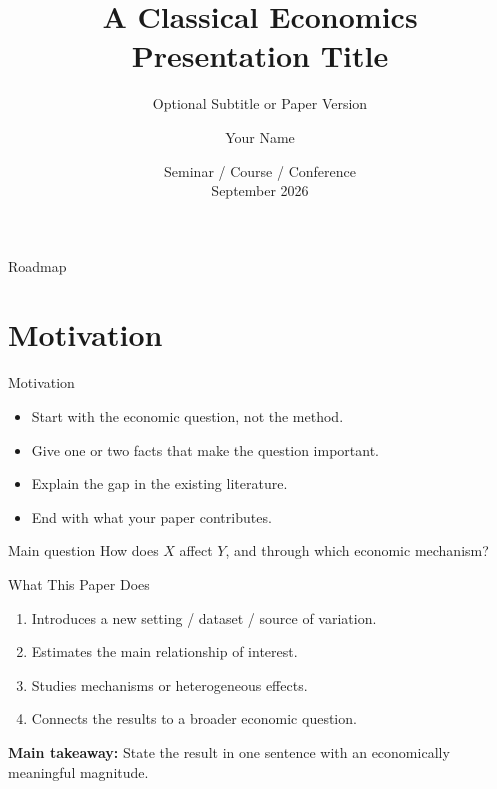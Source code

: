 \documentclass[10pt]{beamer}
\title[Short Paper Title]{A Classical Economics Presentation Title}
\subtitle{Optional Subtitle or Paper Version}
\author[Your Name]{Your Name}
\institute[University]{Department of Economics \\ Your University}
\date{Seminar / Course / Conference \\ September 2026}
\begin{document}

\begin{frame}
  \titlepage
\end{frame}

\begin{frame}{Roadmap}
  \tableofcontents
\end{frame}

\section{Motivation}

\begin{frame}{Motivation}
\begin{itemize}
  \item Start with the economic question, not the method.
  \item Give one or two facts that make the question important.
  \item Explain the gap in the existing literature.
  \item End with what your paper contributes.
\end{itemize}

\vspace{0.6em}
\begin{block}{Main question}
How does $X$ affect $Y$, and through which economic mechanism?
\end{block}
\end{frame}

\begin{frame}{What This Paper Does}
\begin{enumerate}
  \item Introduces a new setting / dataset / source of variation.
  \item Estimates the main relationship of interest.
  \item Studies mechanisms or heterogeneous effects.
  \item Connects the results to a broader economic question.
\end{enumerate}

\vspace{0.8em}
\textbf{Main takeaway:} State the result in one sentence with an economically meaningful magnitude.
\end{frame}
\end{document}
